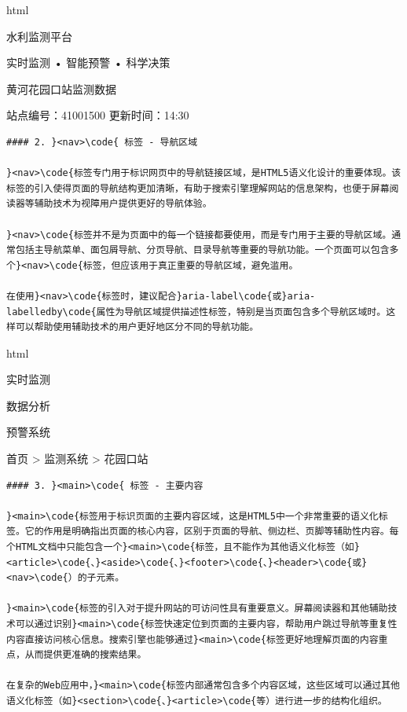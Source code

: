 html

水利监测平台

实时监测 • 智能预警 • 科学决策

黄河花园口站监测数据

站点编号：41001500 \textbar{} 更新时间：14:30

\begin{lstlisting}
#### 2. }<nav>\code{ 标签 - 导航区域

}<nav>\code{标签专门用于标识网页中的导航链接区域，是HTML5语义化设计的重要体现。该标签的引入使得页面的导航结构更加清晰，有助于搜索引擎理解网站的信息架构，也便于屏幕阅读器等辅助技术为视障用户提供更好的导航体验。

}<nav>\code{标签并不是为页面中的每一个链接都要使用，而是专门用于主要的导航区域。通常包括主导航菜单、面包屑导航、分页导航、目录导航等重要的导航功能。一个页面可以包含多个}<nav>\code{标签，但应该用于真正重要的导航区域，避免滥用。

在使用}<nav>\code{标签时，建议配合}aria-label\code{或}aria-labelledby\code{属性为导航区域提供描述性标签，特别是当页面包含多个导航区域时。这样可以帮助使用辅助技术的用户更好地区分不同的导航功能。

\end{lstlisting}

html

实时监测

数据分析

预警系统

首页 \textgreater{} 监测系统 \textgreater{} {花园口站}

\begin{lstlisting}
#### 3. }<main>\code{ 标签 - 主要内容

}<main>\code{标签用于标识页面的主要内容区域，这是HTML5中一个非常重要的语义化标签。它的作用是明确指出页面的核心内容，区别于页面的导航、侧边栏、页脚等辅助性内容。每个HTML文档中只能包含一个}<main>\code{标签，且不能作为其他语义化标签（如}<article>\code{、}<aside>\code{、}<footer>\code{、}<header>\code{或}<nav>\code{）的子元素。

}<main>\code{标签的引入对于提升网站的可访问性具有重要意义。屏幕阅读器和其他辅助技术可以通过识别}<main>\code{标签快速定位到页面的主要内容，帮助用户跳过导航等重复性内容直接访问核心信息。搜索引擎也能够通过}<main>\code{标签更好地理解页面的内容重点，从而提供更准确的搜索结果。

在复杂的Web应用中，}<main>\code{标签内部通常包含多个内容区域，这些区域可以通过其他语义化标签（如}<section>\code{、}<article>\code{等）进行进一步的结构化组织。

\end{lstlisting}

